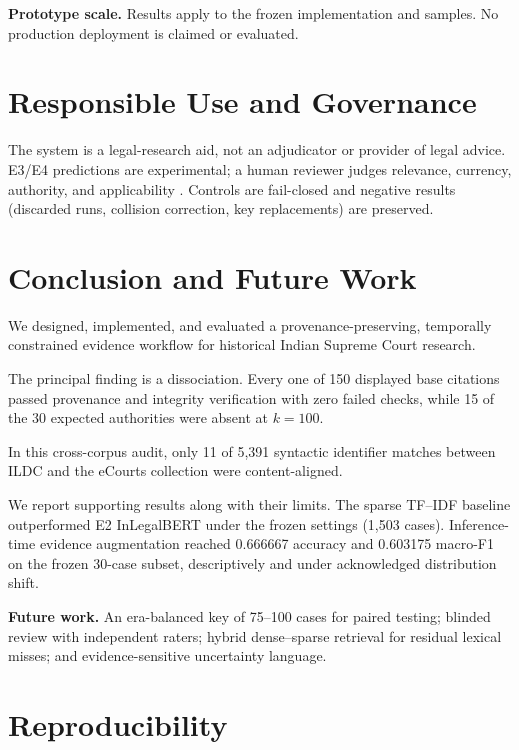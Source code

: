 \documentclass[conference]{IEEEtran}
\begin{document}
\textbf{Prototype scale.} Results apply to the frozen implementation and samples.
No production deployment is claimed or evaluated.

\section{Responsible Use and Governance}

The system is a legal-research aid, not an adjudicator or provider
of legal advice. E3/E4 predictions are experimental; a
human reviewer judges relevance, currency, authority, and
applicability \cite{poojasingh2026}. Controls are fail-closed and negative results
(discarded runs, collision correction, key replacements) are preserved.

\section{Conclusion and Future Work}

We designed, implemented, and evaluated a provenance-preserving, temporally constrained evidence
workflow for historical Indian Supreme Court research.

The principal finding is a dissociation. Every one of 150 displayed base citations
passed provenance and integrity verification with zero failed checks,
while 15 of
the 30 expected authorities were
absent at $k{=}100$.

In this cross-corpus audit, only 11 of 5{,}391 syntactic identifier matches between ILDC and the eCourts collection were content-aligned.

We report supporting results along with their limits. The sparse TF--IDF baseline outperformed E2 InLegalBERT under the frozen settings (1{,}503 cases). Inference-time evidence augmentation
reached 0.666667 accuracy and 0.603175 macro-F1 on the frozen 30-case subset,
descriptively and under acknowledged distribution shift.

\textbf{Future work.} An era-balanced key of 75--100 cases for paired testing;
blinded review with independent raters; hybrid
dense--sparse retrieval for residual lexical misses; and evidence-sensitive
uncertainty language.

\section*{Reproducibility}
\end{document}

